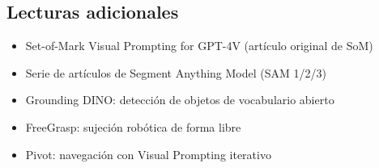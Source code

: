 \subsection{Lecturas adicionales}

\begin{itemize}
    \item Set-of-Mark Visual Prompting for GPT-4V (artículo original de SoM)
    \item Serie de artículos de Segment Anything Model (SAM 1/2/3)
    \item Grounding DINO: detección de objetos de vocabulario abierto
    \item FreeGrasp: sujeción robótica de forma libre
    \item Pivot: navegación con Visual Prompting iterativo
\end{itemize}



